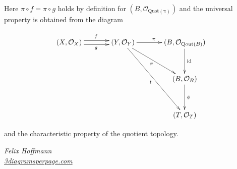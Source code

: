 \documentclass[a4paper]{amsart}            %
\renewcommand{\O}{\mathcal{O}}
\newcommand{\id}{\operatorname{id}}
\theoremstyle{plain}                                               %
\begin{document}
Here $\pi \circ f = \pi \circ g$ holds by definition for $(B,\O_{\operatorname{Quot(\pi)}})$ and the universal property is obtained from the diagram

\begin{align*} \xymatrix@+=1.25cm{(X,\O_X) \ar@<0.66ex>[r]^f \ar@<-0.66ex>[r]_g & (Y,\O_Y) \ar[ddr]_t \ar[dr]_{\pi} \ar[r]^{\pi} & (B,\O_{\operatorname{Qout}(B)}) \ar[d]^{\id}\\
																								&	&	 (B,\O_B) \ar[d]^{\phi} \\ & & (T,\O_T) } \end{align*}

and the characteristic property of the quotient topology.

\vspace{6.4cm}
\begin{flushright}
\textsl{\small    Felix Hoffmann\\ \href{http://www.3diagramsperpage.wordpress.com/}{3diagramsperpage.com}}
\end{flushright}

																									 
\end{document}
